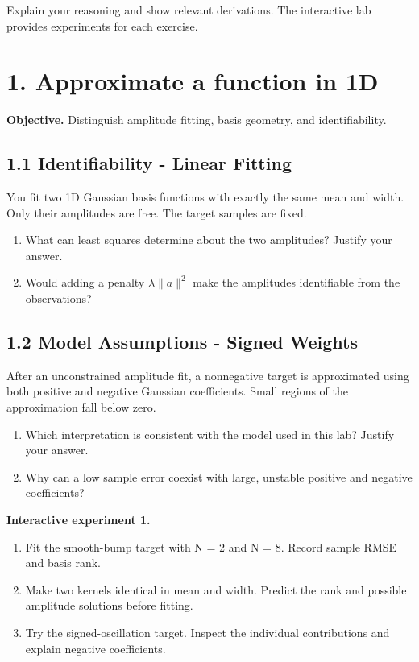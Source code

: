 \documentclass[11pt,a4paper]{article}
\begin{document}
Explain your reasoning and show relevant derivations.
The interactive lab provides experiments for each exercise.
\section*{1. Approximate a function in 1D}
\noindent\textbf{Objective.} Distinguish amplitude fitting, basis geometry, and identifiability.
\subsection*{1.1 Identifiability - Linear Fitting}
You fit two 1D Gaussian basis functions with exactly the same mean and width.
Only their amplitudes are free.
The target samples are fixed.
\begin{enumerate}[label=(\alph*),nosep]
\item What can least squares determine about the two amplitudes?
Justify your answer.
\item Would adding a penalty $\lambda\|a\|^2$ make the amplitudes identifiable from the observations?
\end{enumerate}
\subsection*{1.2 Model Assumptions - Signed Weights}
After an unconstrained amplitude fit, a nonnegative target is approximated using both positive and negative Gaussian coefficients.
Small regions of the approximation fall below zero.
\begin{enumerate}[label=(\alph*),nosep]
\item Which interpretation is consistent with the model used in this lab?
Justify your answer.
\item Why can a low sample error coexist with large, unstable positive and negative coefficients?
\end{enumerate}
\noindent\textbf{Interactive experiment 1.}\begin{enumerate}[nosep]
\item Fit the smooth-bump target with N = 2 and N = 8.
Record sample RMSE and basis rank.
\item Make two kernels identical in mean and width.
Predict the rank and possible amplitude solutions before fitting.
\item Try the signed-oscillation target.
Inspect the individual contributions and explain negative coefficients.
\end{enumerate}
\end{document}
